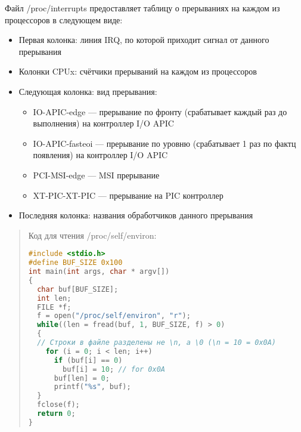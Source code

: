 Файл /proc/interrupts предоставляет таблицу о прерываниях на каждом из процессоров в следующем виде:
\begin{itemize}
\item Первая колонка: линия IRQ, по которой приходит сигнал от данного прерывания
\item Колонки CPUx: счётчики прерываний на каждом из процессоров
\item Следующая колонка: вид прерывания:
\begin{itemize}
     \item IO-APIC-edge — прерывание по фронту (срабатывает каждый раз до выполнения) на контроллер I/O APIC
    \item IO-APIC-fasteoi — прерывание по уровню (срабатывает 1 раз по фактц появления) на контроллер I/O APIC
    \item PCI-MSI-edge — MSI прерывание
    \item XT-PIC-XT-PIC — прерывание на PIC контроллер
\end{itemize}
\item Последняя колонка: названия обработчиков данного прерывания
\end{itemize}

\begin{quote}
Код для чтения /proc/self/environ:
\begin{lstlisting}[language=C, label=lst:1, caption=код для чтения /proc/self/environ]
#include <stdio.h>
#define BUF_SIZE 0x100
int main(int args, char * argv[])
{
  char buf[BUF_SIZE];
  int len;
  FILE *f;
  f = open("/proc/self/environ", "r");
  while((len = fread(buf, 1, BUF_SIZE, f) > 0)
  {
  // Строки в файле разделены не \n, а \0 (\n = 10 = 0x0A)
    for (i = 0; i < len; i++)
      if (buf[i] == 0)
        buf[i] = 10; // for 0x0A
      buf[len] = 0;
      printf("%s", buf);
  }
  fclose(f);
  return 0;
}
\end{lstlisting}
\end{quote}

